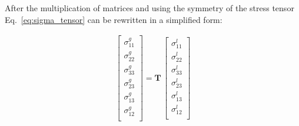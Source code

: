 \documentclass[materials,article,submit,moreauthors,pdftex]{Definitions/mdpi}
\begin{document}
After the multiplication of matrices and using the symmetry of the stress tensor Eq.~\ref{eq:sigma_tensor} can be rewritten in a simplified form:

\begin{eqnarray}
\left [
\begin{array}{c}
\sigma^g_{11}\\
\sigma^g_{22}\\ 
\sigma^g_{33}\\ 
\sigma^g_{23}\\
\sigma^g_{13}\\
\sigma^g_{12}\\
\end{array}
\right ]=
\textbf{T}\,\left [
\begin{array}{c}
\sigma^l_{11}\\
\sigma^l_{22}\\ 
\sigma^l_{33}\\
\sigma^l_{23}\\
\sigma^l_{13}\\
\sigma^l_{12}\\
\end{array}
\right ]
\label{eq:stress}
\end{eqnarray}
\end{document}
